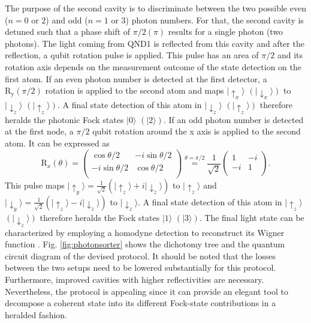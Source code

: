 \documentclass[prl,amsmath,amssymb,bibnotes,aps,longbibliography,12pt]{revtex4-1}
\newcommand{\ket}[1]{|{#1}\rangle}
\begin{document}
The purpose of the second cavity is to discriminate between the two possible even ($n=0$ or $2$) and odd ($n=1$ or $3$) photon numbers. For that, the second cavity is detuned \cite{hacker2019supplement} such that a phase shift of $\pi/2(\pi)$ results for a single photon (two photons). The light coming from QND1 is reflected from this cavity and after the reflection, a qubit rotation pulse is applied. This pulse has an area of $\pi/2$ and its rotation axis depends on the measurement outcome of the state detection on the first atom. If an even photon number is detected at the first detector, a $\text{R}_\text{y}(\pi/2)$ rotation is applied to the second atom and maps $\ket{\uparrow_x}$ $(\ket{\downarrow_x})$ to $\ket{\downarrow_z}$ $(\ket{\uparrow_z})$. A final state detection of this atom in $\ket{\downarrow_z}$ $(\ket{\uparrow_z})$ therefore heralds the photonic Fock states $\ket{0}$ $(\ket{2})$.
If an odd photon number is detected at the first node, a $\pi/2$ qubit rotation around the x axis is applied to the second atom. It can be expressed as 
\begin{equation}
\text{R}_x(\theta)=
\begin{pmatrix}\cos\theta/2 & -i\sin\theta/2 \\-i\sin\theta/2 & \cos\theta/2\\\end{pmatrix}\overset{\theta=\pi/2}{=}\frac{1}{\sqrt{2}}\begin{pmatrix}1 & -i \\-i & 1\\
\end{pmatrix}.
\end{equation}
This pulse maps $\ket{\uparrow_y}=\frac{1}{\sqrt{2}}(\ket{\uparrow_z}+i\ket{\downarrow_z})$ to $\ket{\uparrow_z}$ and $\ket{\downarrow_y}=\frac{1}{\sqrt{2}}(\ket{\uparrow_z}-i\ket{\downarrow_z})$ to $\ket{\downarrow_z}$. A final state detection of this atom in $\ket{\uparrow_z}$ $(\ket{\downarrow_z})$ therefore heralds the Fock states $\ket{1}$ $(\ket{3})$. The final light state can be characterized by employing a homodyne detection to reconstruct its Wigner function \cite{hacker2019supplement}.
Fig. \ref{fig:photonsorter} shows the dichotomy tree and the quantum circuit diagram of the devised protocol. It should be noted that the losses between the two setups need to be lowered substantially for this protocol. Furthermore, improved cavities with higher reflectivities are necessary. Nevertheless, the protocol is appealing since it can provide an elegant tool to decompose a coherent state into its different Fock-state contributions in a heralded fashion. 
\end{document}
